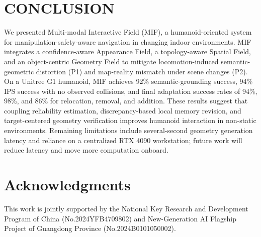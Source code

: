 \documentclass[conference]{IEEEtran}
\begin{document}
\section{CONCLUSION}
\label{sec:conclusion}
%
We presented Multi-modal Interactive Field (MIF), a humanoid-oriented system for manipulation-safety-aware navigation in changing indoor environments. MIF integrates a confidence-aware Appearance Field, a topology-aware Spatial Field, and an object-centric Geometry Field to mitigate locomotion-induced semantic-geometric distortion (P1) and map-reality mismatch under scene changes (P2). On a Unitree G1 humanoid, MIF achieves 92\% semantic-grounding success, 94\% IPS success with no observed collisions, and final adaptation success rates of 94\%, 98\%, and 86\% for relocation, removal, and addition. These results suggest that coupling reliability estimation, discrepancy-based local memory revision, and target-centered geometry verification improves humanoid interaction in non-static environments. Remaining limitations include several-second geometry generation latency and reliance on a centralized RTX 4090 workstation; future work will reduce latency and move more computation onboard.


\section*{Acknowledgments}
This work is jointly supported by the National Key Research and Development Program of China (No.2024YFB4709802) and New-Generation AI Flagship Project of Guangdong Province (No.2024B0101050002).





\clearpage
\renewcommand{\baselinestretch}{1}
\setlength{\belowcaptionskip}{0pt}
\end{document}
